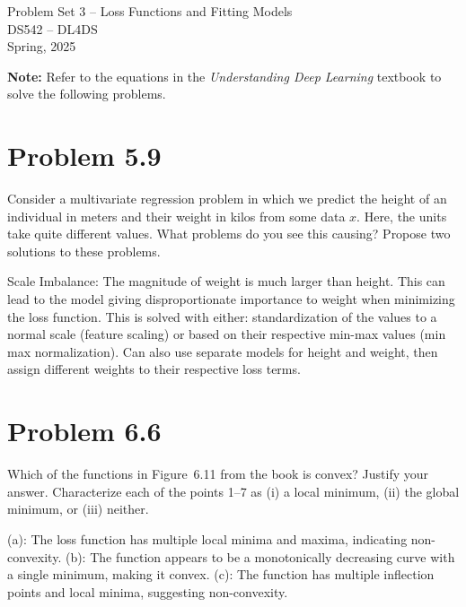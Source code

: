 \documentclass[10pt]{article}
\begin{document}
\begin{center}
    \LARGE {Problem Set 3 – Loss Functions and Fitting Models} \\[1em]
    \Large{DS542 – DL4DS} \\[0.5em]
    \large Spring, 2025
\end{center}

\vspace{2em}

\noindent\textbf{Note:} Refer to the equations in the \textit{Understanding Deep Learning} textbook to solve the following problems.

\vspace{2em}

\section*{Problem 5.9}
Consider a multivariate regression problem in which we predict the height of an individual in meters and their weight in kilos from some data $x$. Here, the units take quite different values. What problems do you see this causing? Propose two solutions to these problems.
\vspace{2em}

Scale Imbalance: The magnitude of weight is much larger than height. This can lead to the model giving disproportionate importance to weight when minimizing the loss function. This is solved with either: standardization of the values to a normal scale (feature scaling) or based on their respective min-max values (min max normalization). Can also use separate models for height and weight, then assign different weights to their respective loss terms.

\vspace{5em}

\section*{Problem 6.6}
Which of the functions in Figure~6.11 from the book is convex? Justify your answer. Characterize each of the points 1--7 as (i) a local minimum, (ii) the global minimum, or (iii) neither.
\vspace{2em}

(a): The loss function has multiple local minima and maxima, indicating non-convexity.
(b): The function appears to be a monotonically decreasing curve with a single minimum, making it convex.
(c): The function has multiple inflection points and local minima, suggesting non-convexity.
\end{document}

